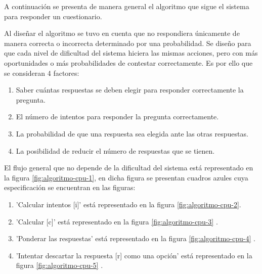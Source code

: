 

A continuación se presenta de manera general el algoritmo que sigue el
sistema para responder un cuestionario.

\noindent Al diseñar el algoritmo se tuvo en cuenta que no respondiera únicamente
de manera correcta o incorrecta determinado por una probabilidad.
Se diseño para que cada nivel de dificultad del sistema hiciera las mismas acciones,
pero con más oportunidades o más probabilidades de contestar correctamente.
Es por ello que se consideran 4 factores:

\begin{enumerate}
    \item Saber cuántas respuestas se deben elegir para responder correctamente la pregunta.
    \item El número de intentos para responder la pregunta correctamente.
    \item La probabilidad de que una respuesta sea elegida ante las otras respuestas.
    \item La posibilidad de reducir el número de respuestas que se tienen.
\end{enumerate}

El flujo general que no depende de la dificultad del sistema está representado en la figura \ref{fig:algoritmo-cpu-1},
en dicha figura se presentan cuadros azules cuya especificación se encuentran en las figuras:


\begin{enumerate}
    \item 'Calcular intentos [i]' está representado en la figura \ref{fig:algoritmo-cpu-2}.
    \item 'Calcular [c]' está representado en la figura \ref{fig:algoritmo-cpu-3} .
    \item 'Ponderar las respuestas' está representado en la figura \ref{fig:algoritmo-cpu-4} .
    \item 'Intentar descartar la respuesta [r] como una opción' está representado en la figura \ref{fig:algoritmo-cpu-5} .
\end{enumerate}

\clearpage

\clearpage


